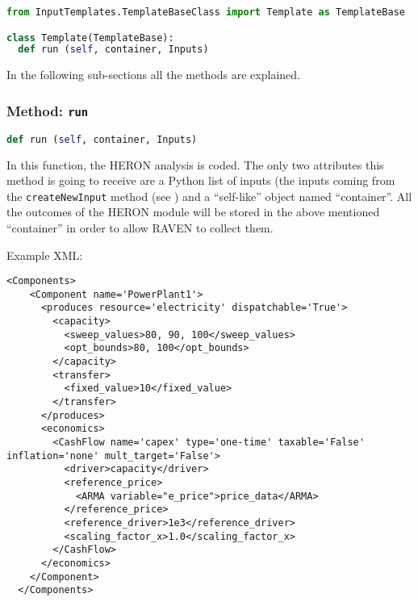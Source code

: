 \begin{lstlisting}[language=python]
from InputTemplates.TemplateBaseClass import Template as TemplateBase

class Template(TemplateBase):
  def run (self, container, Inputs)
\end{lstlisting}
In the following sub-sections all the methods are explained.
\subsubsection{Method: \texttt{run}}
\label{subsubsec:runExternalModelPlugin}
\begin{lstlisting}[language=python]
def run (self, container, Inputs)
\end{lstlisting}

In this function, the HERON analysis is coded.
%
The only two attributes this method is going to receive are a Python list of inputs
(the inputs coming from the \texttt{createNewInput} method (see \cite{RAVENuserManual}) and a ``self-like'' object
named ``container''.
%
All the outcomes of the HERON module will be stored in the above mentioned ``container'' in order to 
allow RAVEN to collect them.

Example XML:
\begin{lstlisting}[style=XML,morekeywords={subType,ModuleToLoad}]
  <Components>
    <Component name='PowerPlant1'>
      <produces resource='electricity' dispatchable='True'>
        <capacity>
          <sweep_values>80, 90, 100</sweep_values>
          <opt_bounds>80, 100</opt_bounds>
        </capacity>
        <transfer>
          <fixed_value>10</fixed_value>
        </transfer>
      </produces>
      <economics>
        <CashFlow name='capex' type='one-time' taxable='False' inflation='none' mult_target='False'>
          <driver>capacity</driver>
          <reference_price>
            <ARMA variable="e_price">price_data</ARMA>
          </reference_price>
          <reference_driver>1e3</reference_driver>
          <scaling_factor_x>1.0</scaling_factor_x>
        </CashFlow>
      </economics>
    </Component>
  </Components>
\end{lstlisting}

